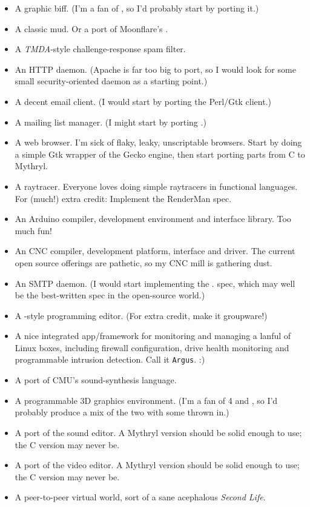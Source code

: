 \begin{itemize}
\item A graphic biff.  (I'm a fan of , so I'd probably start by porting it.)
\item A classic mud.  Or a port of Moonflare's  .
\item A {\em TMDA}-style challenge-response spam filter.
\item An HTTP daemon.  (Apache is far too big to port, so I would look for some small security-oriented daemon as a starting point.)
\item A decent email client.  (I would start by porting the  Perl/Gtk client.)
\item A mailing list manager.  (I might start by porting .)
\item A web browser.  I'm sick of flaky, leaky, unscriptable browsers.  Start by doing a simple Gtk wrapper of the Gecko engine, then start porting parts from C to Mythryl.
\item A raytracer.  Everyone loves doing simple raytracers in functional languages.  For (much!) extra credit: Implement the RenderMan spec.
\item An Arduino compiler, development environment and interface library.  Too much fun!
\item An CNC compiler, development platform, interface and driver. The current open source offerings are pathetic, so my CNC mill is gathering dust.
\item An SMTP daemon.  (I would start implementing the . spec, which may well be the best-written spec in the open-source world.)
\item A -style programming editor.  (For extra credit, make it groupware!) 
\item A nice integrated app/framework for monitoring and managing a lanful of Linux boxes, including firewall configuration, drive health monitoring and programmable intrusion detection. Call it {\tt Argus}. :)
\item A port of CMU's  sound-synthesis language.
\item A programmable 3D graphics environment.  (I'm a fan of  4 and  , so I'd probably produce a mix of the two with some   thrown in.)
\item A port of the  sound editor. A Mythryl version should be solid enough to use;  the C version may never be.
\item A port of the  video editor. A Mythryl version should be solid enough to use;  the C version may never be.
\item A peer-to-peer virtual world, sort of a sane acephalous {\em Second Life}.
\end{itemize}

